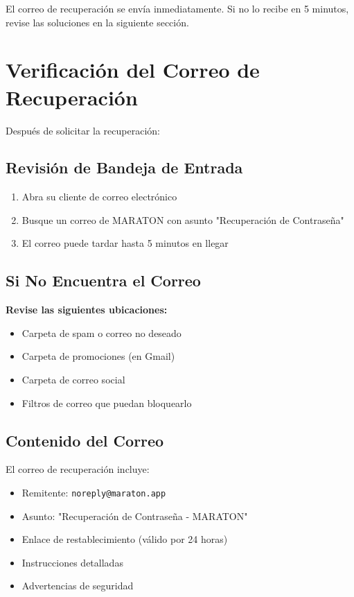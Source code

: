 \documentclass[11pt,a4paper,twoside]{book}
\begin{document}
\begin{infobox}
El correo de recuperación se envía inmediatamente. Si no lo recibe en 5 minutos, revise las soluciones en la siguiente sección.
\end{infobox}

\section{Verificación del Correo de Recuperación}

Después de solicitar la recuperación:

\subsection{Revisión de Bandeja de Entrada}
\begin{enumerate}
    \item Abra su cliente de correo electrónico
    \item Busque un correo de MARATON con asunto "Recuperación de Contraseña"
    \item El correo puede tardar hasta 5 minutos en llegar
\end{enumerate}

\subsection{Si No Encuentra el Correo}

\begin{warningbox}
\textbf{Revise las siguientes ubicaciones:}
\begin{itemize}
    \item Carpeta de spam o correo no deseado
    \item Carpeta de promociones (en Gmail)
    \item Carpeta de correo social
    \item Filtros de correo que puedan bloquearlo
\end{itemize}
\end{warningbox}

\subsection{Contenido del Correo}

El correo de recuperación incluye:
\begin{itemize}
    \item Remitente: \texttt{noreply@maraton.app}
    \item Asunto: "Recuperación de Contraseña - MARATON"
    \item Enlace de restablecimiento (válido por 24 horas)
    \item Instrucciones detalladas
    \item Advertencias de seguridad
\end{itemize}
\end{document}
